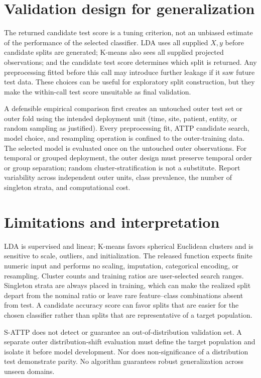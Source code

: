 \documentclass[conference]{IEEEtran}
\begin{document}
\section{Validation design for generalization}
The returned candidate test score is a tuning criterion, not an unbiased estimate of the performance of the selected classifier. LDA uses all supplied \(X,y\) before candidate splits are generated; K-means also sees all supplied projected observations; and the candidate test score determines which split is returned. Any preprocessing fitted before this call may introduce further leakage if it saw future test data. These choices can be useful for exploratory split construction, but they make the within-call test score unsuitable as final validation.

A defensible empirical comparison first creates an untouched outer test set or outer fold using the intended deployment unit (time, site, patient, entity, or random sampling as justified). Every preprocessing fit, ATTP candidate search, model choice, and resampling operation is confined to the outer-training data. The selected model is evaluated once on the untouched outer observations. For temporal or grouped deployment, the outer design must preserve temporal order or group separation; random cluster-stratification is not a substitute. Report variability across independent outer units, class prevalence, the number of singleton strata, and computational cost.

\section{Limitations and interpretation}
LDA is supervised and linear; K-means favors spherical Euclidean clusters and is sensitive to scale, outliers, and initialization. The released function expects finite numeric input and performs no scaling, imputation, categorical encoding, or resampling. Cluster counts and training ratios are user-selected search ranges. Singleton strata are always placed in training, which can make the realized split depart from the nominal ratio or leave rare feature--class combinations absent from test. A candidate accuracy score can favor splits that are easier for the chosen classifier rather than splits that are representative of a target population.

S-ATTP does not detect or guarantee an out-of-distribution validation set. A separate outer distribution-shift evaluation must define the target population and isolate it before model development. Nor does non-significance of a distribution test demonstrate parity. No algorithm guarantees robust generalization across unseen domains.
\end{document}

